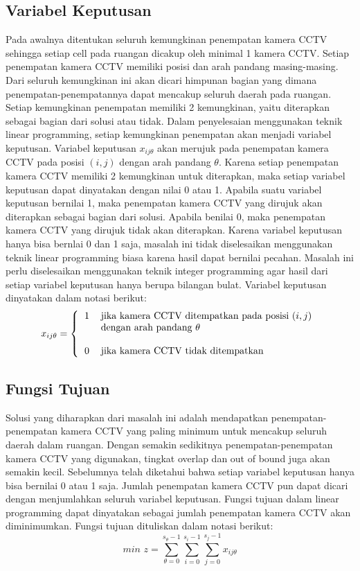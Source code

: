 \subsection{Variabel Keputusan}
Pada awalnya ditentukan seluruh kemungkinan penempatan kamera CCTV sehingga setiap cell pada ruangan dicakup oleh minimal 1 kamera CCTV. Setiap penempatan kamera CCTV memiliki posisi dan arah pandang masing-masing. Dari seluruh kemungkinan ini akan dicari himpunan bagian yang dimana penempatan-penempatannya dapat mencakup seluruh daerah pada ruangan. Setiap kemungkinan penempatan memiliki 2 kemungkinan, yaitu diterapkan sebagai bagian dari solusi atau tidak. Dalam penyelesaian menggunakan teknik linear programming, setiap kemungkinan penempatan akan menjadi variabel keputusan. Variabel keputusan \(x_{ij\theta}\) akan merujuk pada penempatan kamera CCTV pada posisi \((i,j)\) dengan arah pandang \(\theta\). Karena setiap penempatan kamera CCTV memiliki 2 kemungkinan untuk diterapkan, maka setiap variabel keputusan dapat dinyatakan dengan nilai 0 atau 1. Apabila suatu variabel keputusan bernilai 1, maka penempatan kamera CCTV yang dirujuk akan diterapkan sebagai bagian dari solusi. Apabila benilai 0, maka penempatan kamera CCTV yang dirujuk tidak akan diterapkan. Karena variabel keputusan hanya bisa bernlai 0 dan 1 saja, masalah ini tidak diselesaikan menggunakan teknik linear programming biasa karena hasil dapat bernilai pecahan. Masalah ini perlu diselesaikan menggunakan teknik integer programming agar hasil dari setiap variabel keputusan hanya berupa bilangan bulat. Variabel keputusan dinyatakan dalam notasi berikut:
\begin{equation*}
	x_{ij\theta} =
	\left \{
  		\begin{tabular}{cl}
  			1 & jika kamera CCTV ditempatkan pada posisi $(i,j)$\\
  			  & dengan arah pandang $\theta$\\
  			  &  \\
  			0 & jika kamera CCTV tidak ditempatkan
  		\end{tabular}
  	\right.
\end{equation*}

\subsection{Fungsi Tujuan}
Solusi yang diharapkan dari masalah ini adalah mendapatkan penempatan-penempatan kamera CCTV yang paling minimum untuk mencakup seluruh daerah dalam ruangan. Dengan semakin sedikitnya penempatan-penempatan kamera CCTV yang digunakan, tingkat overlap dan out of bound juga akan semakin kecil. Sebelumnya telah diketahui bahwa setiap variabel keputusan hanya bisa bernilai 0 atau 1 saja. Jumlah penempatan kamera CCTV pun dapat dicari dengan menjumlahkan seluruh variabel keputusan. Fungsi tujuan dalam linear programming dapat dinyatakan sebagai jumlah penempatan kamera CCTV akan diminimumkan. Fungsi tujuan dituliskan dalam notasi berikut:
\begin{equation*}
	\textit{min }z = \sum_{\theta=0}^{s_{\theta}-1} \sum_{i=0}^{s_i-1} \sum_{j=0}^{s_j-1} x_{ij\theta}
\end{equation*}

